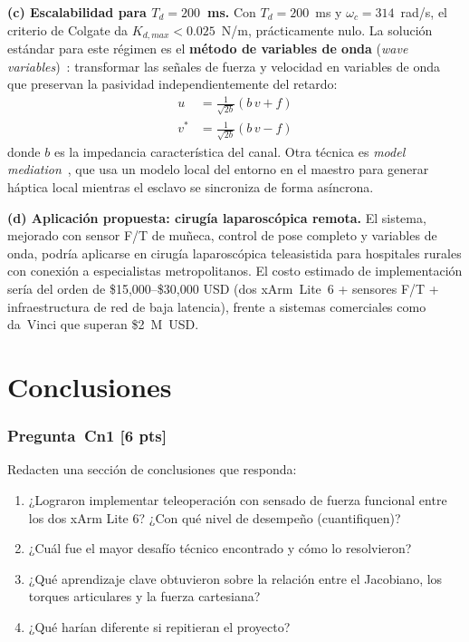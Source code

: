 \documentclass[journal,10pt,twoside]{IEEEtran}
\newcommand{\pts}[1]{\textcolor{tec_red}{\textbf{[#1 pts]}}}
\begin{document}
\textbf{(c) Escalabilidad para $T_d = 200$~ms.}
Con $T_d = 200$~ms y $\omega_c = 314$~rad/s, el criterio de Colgate
da $K_{d,max} < 0.025$~N/m, prácticamente nulo. La solución estándar
para este régimen es el \textbf{método de variables de onda}
(\textit{wave variables})~\cite{niemeyer2008}: transformar las
señales de fuerza y velocidad en variables de onda que preservan
la pasividad independientemente del retardo:
\begin{align*}
  u   &= \frac{1}{\sqrt{2b}}(b\,v + f) \\
  v^* &= \frac{1}{\sqrt{2b}}(b\,v - f)
\end{align*}
donde $b$ es la impedancia característica del canal. Otra técnica es
\textit{model mediation}~\cite{niemeyer2008}, que usa un modelo
local del entorno en el maestro para generar háptica local mientras
el esclavo se sincroniza de forma asíncrona.

\textbf{(d) Aplicación propuesta: cirugía laparoscópica remota.}
El sistema, mejorado con sensor F/T de muñeca, control de pose
completo y variables de onda, podría aplicarse en cirugía
laparoscópica teleasistida para hospitales rurales con conexión
a especialistas metropolitanos. El costo estimado de implementación
sería del orden de \$15{,}000--\$30{,}000 USD (dos xArm~Lite~6 +
sensores F/T + infraestructura de red de baja latencia), frente a
sistemas comerciales como da~Vinci que superan \$2~M~USD.

\section{Conclusiones}
\label{sec:conclusions}

\subsubsection*{Pregunta~Cn1 \pts{6}}
Redacten una sección de conclusiones que responda:
\begin{enumerate}[label=(\alph*)]
  \item ¿Lograron implementar teleoperación con sensado de fuerza
        funcional entre los dos xArm Lite 6? ¿Con qué nivel de
        desempeño (cuantifiquen)?
  \item ¿Cuál fue el mayor desafío técnico encontrado y cómo lo resolvieron?
  \item ¿Qué aprendizaje clave obtuvieron sobre la relación entre
        el Jacobiano, los torques articulares y la fuerza cartesiana?
  \item ¿Qué harían diferente si repitieran el proyecto?
\end{enumerate}
\end{document}
